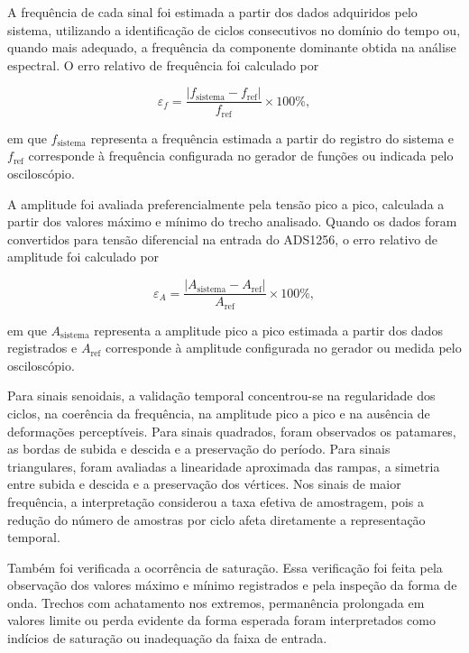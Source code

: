 \documentclass[a4paper,12pt]{fcte}
\begin{document}
A frequência de cada sinal foi estimada a partir dos dados adquiridos pelo sistema, utilizando a identificação de ciclos consecutivos no domínio do tempo ou, quando mais adequado, a frequência da componente dominante obtida na análise espectral. O erro relativo de frequência foi calculado por

\begin{equation}
    \varepsilon_f =
    \frac{\left|f_{\mathrm{sistema}}-f_{\mathrm{ref}}\right|}
    {f_{\mathrm{ref}}}
    \times 100\%,
    \label{eq:erro_frequencia}
\end{equation}

\noindent
em que $f_{\mathrm{sistema}}$ representa a frequência estimada a partir do registro do sistema e $f_{\mathrm{ref}}$ corresponde à frequência configurada no gerador de funções ou indicada pelo osciloscópio.

A amplitude foi avaliada preferencialmente pela tensão pico a pico, calculada a partir dos valores máximo e mínimo do trecho analisado. Quando os dados foram convertidos para tensão diferencial na entrada do ADS1256, o erro relativo de amplitude foi calculado por

\begin{equation}
    \varepsilon_A =
    \frac{\left|A_{\mathrm{sistema}}-A_{\mathrm{ref}}\right|}
    {A_{\mathrm{ref}}}
    \times 100\%,
    \label{eq:erro_amplitude}
\end{equation}

\noindent
em que $A_{\mathrm{sistema}}$ representa a amplitude pico a pico estimada a partir dos dados registrados e $A_{\mathrm{ref}}$ corresponde à amplitude configurada no gerador ou medida pelo osciloscópio.

Para sinais senoidais, a validação temporal concentrou-se na regularidade dos ciclos, na coerência da frequência, na amplitude pico a pico e na ausência de deformações perceptíveis. Para sinais quadrados, foram observados os patamares, as bordas de subida e descida e a preservação do período. Para sinais triangulares, foram avaliadas a linearidade aproximada das rampas, a simetria entre subida e descida e a preservação dos vértices. Nos sinais de maior frequência, a interpretação considerou a taxa efetiva de amostragem, pois a redução do número de amostras por ciclo afeta diretamente a representação temporal.

Também foi verificada a ocorrência de saturação. Essa verificação foi feita pela observação dos valores máximo e mínimo registrados e pela inspeção da forma de onda. Trechos com achatamento nos extremos, permanência prolongada em valores limite ou perda evidente da forma esperada foram interpretados como indícios de saturação ou inadequação da faixa de entrada.
\end{document}
